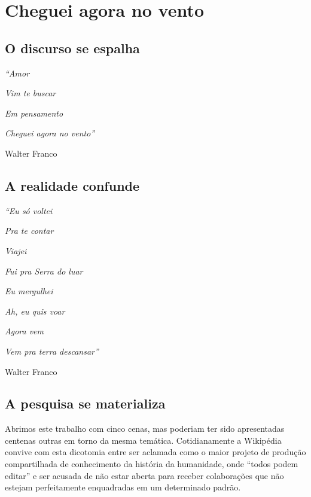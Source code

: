 \chapter{Cheguei agora no vento}

\section{O discurso se espalha}


\singlespacing
\begin{flushright}
\textit{``Amor}

\textit{Vim te buscar}

\textit{Em pensamento}

\textit{Cheguei agora no vento''}

Walter Franco

\end{flushright}
\doublespacing




\newpage

\section{A realidade confunde}

\singlespacing
\begin{flushright}
\textit{``Eu só voltei}

\textit{Pra te contar}

\textit{Viajei}

\textit{Fui pra Serra do luar}

\textit{Eu mergulhei}

\textit{Ah, eu quis voar}

\textit{Agora vem}

\textit{Vem pra terra descansar''}

Walter Franco

\end{flushright}
\doublespacing


\newpage

\newpage


\section{A pesquisa se materializa}

Abrimos este trabalho com cinco cenas, mas poderiam ter sido apresentadas centenas outras em torno da mesma temática. Cotidianamente a Wikipédia convive com esta dicotomia entre ser aclamada como o maior projeto de produção compartilhada de conhecimento da história da humanidade, onde ``todos podem editar'' e ser acusada de não estar aberta para receber colaborações que não estejam perfeitamente enquadradas em um determinado padrão.

